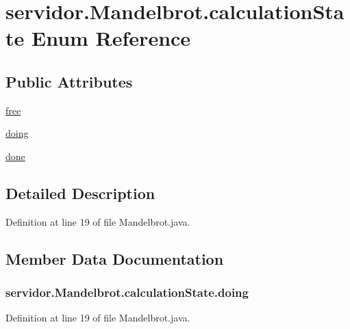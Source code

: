 \hypertarget{enumservidor_1_1Mandelbrot_1_1calculationState}{}\section{servidor.\+Mandelbrot.\+calculation\+State Enum Reference}
\label{enumservidor_1_1Mandelbrot_1_1calculationState}
\subsection*{Public Attributes}
\begin{DoxyCompactItemize}
\item 
\hyperlink{enumservidor_1_1Mandelbrot_1_1calculationState_a389a193a7ce972884fbb89e576175861}{free}
\item 
\hyperlink{enumservidor_1_1Mandelbrot_1_1calculationState_a112a43895b4da3bb11c0f05330a6fc1e}{doing}
\item 
\hyperlink{enumservidor_1_1Mandelbrot_1_1calculationState_af6bab61e31147be188ed02d6aa5b90df}{done}
\end{DoxyCompactItemize}


\subsection{Detailed Description}


Definition at line 19 of file Mandelbrot.\+java.



\subsection{Member Data Documentation}
\subsubsection[{\texorpdfstring{doing}{doing}}]{\setlength{\rightskip}{0pt plus 5cm}servidor.\+Mandelbrot.\+calculation\+State.\+doing}\hypertarget{enumservidor_1_1Mandelbrot_1_1calculationState_a112a43895b4da3bb11c0f05330a6fc1e}{}\label{enumservidor_1_1Mandelbrot_1_1calculationState_a112a43895b4da3bb11c0f05330a6fc1e}


Definition at line 19 of file Mandelbrot.\+java.


